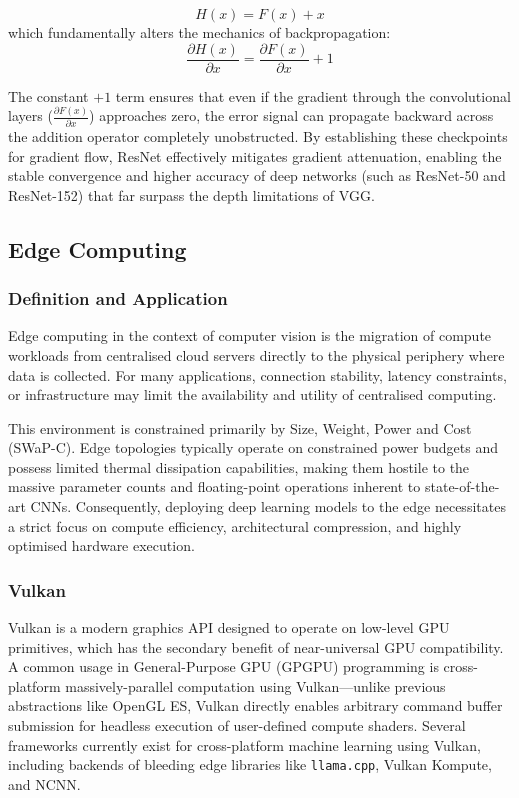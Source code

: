\documentclass[10pt, a4paper]{article}
\begin{document}
\begin{equation}
H(x) = F(x) + x
\end{equation}
which fundamentally alters the mechanics of backpropagation:
\begin{equation}
\frac{\partial H(x)}{\partial x} = \frac{\partial F(x)}{\partial x} + 1
\end{equation}

The constant $+1$ term ensures that even if the gradient through the convolutional layers ($\frac{\partial F(x)}{\partial x}$) approaches zero, the error signal can propagate backward across the addition operator completely unobstructed. By establishing these checkpoints for gradient flow, ResNet effectively mitigates gradient attenuation, enabling the stable convergence and higher accuracy of deep networks (such as ResNet-50 and ResNet-152) that far surpass the depth limitations of VGG.

\subsection{Edge Computing}

\subsubsection{Definition and Application}
Edge computing in the context of computer vision is the migration of compute workloads from centralised cloud servers directly to the physical periphery where data is collected. For many applications, connection stability, latency constraints, or infrastructure may limit the availability and utility of centralised computing.

This environment is constrained primarily by Size, Weight, Power and Cost (SWaP-C). Edge topologies typically operate on constrained power budgets and possess limited thermal dissipation capabilities, making them hostile to the massive parameter counts and floating-point operations inherent to state-of-the-art CNNs\cite{shi_edge_2016}. Consequently, deploying deep learning models to the edge necessitates a strict focus on compute efficiency, architectural compression, and highly optimised hardware execution.

\subsubsection{Vulkan}
Vulkan is a modern graphics API designed to operate on low-level GPU primitives, which has the secondary benefit of near-universal GPU compatibility\cite{khronos_group_vulkan_2026}. A common usage in General-Purpose GPU (GPGPU) programming is cross-platform massively-parallel computation using Vulkan---unlike previous abstractions like OpenGL ES, Vulkan directly enables arbitrary command buffer submission for headless execution of user-defined compute shaders. Several frameworks currently exist for cross-platform machine learning using Vulkan, including backends of bleeding edge libraries like \texttt{llama.cpp}, Vulkan Kompute, and NCNN.
\end{document}
